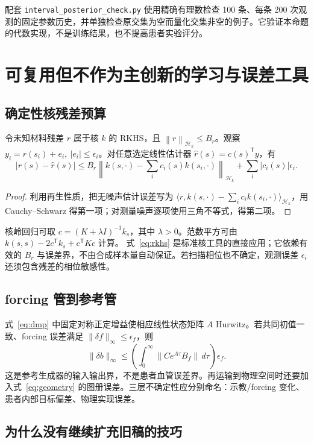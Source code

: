 \documentclass[11pt,a4paper]{article}
\theoremstyle{cn}
\newcommand{\norm}[1]{\left\lVert #1\right\rVert}
\begin{document}
配套 \texttt{interval\_posterior\_check.py} 使用精确有理数检查 100 条、每条 200 次观测的固定参数历史，并单独检查原交集为空而量化交集非空的例子。它验证本命题的代数实现，不是训练结果，也不提高患者实验评分。

\section{可复用但不作为主创新的学习与误差工具}
\label{app:gp}

\subsection{确定性核残差预算}

令未知材料残差 \(r\) 属于核 \(k\) 的 RKHS，且
\(\norm r_{\mathcal H_k}\le B_r\)。观察
\(y_i=r(s_i)+e_i,\ |e_i|\le\epsilon_i\)。对任意选定线性估计器
\(\widehat r(s)=c(s)^{\mathsf T}y\)，有
\begin{equation}
|r(s)-\widehat r(s)|
\le
B_r\left\|k(s,\cdot)-\sum_i c_i(s)k(s_i,\cdot)\right\|_{\mathcal H_k}
+\sum_i|c_i(s)|\epsilon_i.
\label{eq:rkhs}
\end{equation}
\begin{proof}
利用再生性质，把无噪声估计误差写为
\(\langle r,k(s,\cdot)-\sum_i c_i k(s_i,\cdot)\rangle_{\mathcal H_k}\)，用 Cauchy--Schwarz 得第一项；对测量噪声逐项使用三角不等式，得第二项。
\end{proof}

核岭回归可取 \(c=(K+\lambda I)^{-1}k_s\)，其中 \(\lambda>0\)。范数平方可由
\(k(s,s)-2c^{\mathsf T}k_s+c^{\mathsf T}Kc\) 计算。
式~\eqref{eq:rkhs} 是标准核工具的直接应用；它依赖有效的 \(B_r\) 与误差界，不由合成样本量自动保证。若扫描相位也不确定，观测误差 \(\epsilon_i\) 还须包含残差的相位敏感性。

\subsection{forcing 管到参考管}

式~\eqref{eq:dmp} 中固定对称正定增益使相应线性状态矩阵 \(A\) Hurwitz。若共同初值一致、forcing 误差满足 \(\|\delta f\|_\infty\le\epsilon_f\)，则
\[
\|\delta b\|_\infty\le
\left(\int_0^\infty\|C e^{A\tau}B_f\|\,d\tau\right)\epsilon_f.
\]
这是参考生成器的输入输出界，不是患者血管误差界。再运输到物理空间时还要加入式~\eqref{eq:geometry} 的图册误差。三层不确定性应分别命名：示教/forcing 变化、患者内部目标偏差、物理实现误差。

\subsection{为什么没有继续扩充旧稿的技巧}
\end{document}
